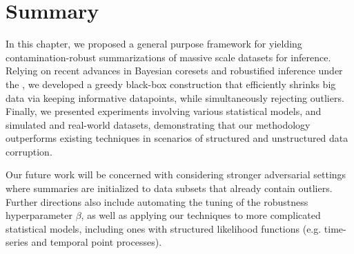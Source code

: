 \section{Summary}%
\label{sec:conclusion}
In this chapter, we proposed a general purpose framework for yielding  contamination-robust summarizations of massive scale datasets for inference. Relying on recent advances in Bayesian coresets and robustified inference under the \bdiv{}, we developed a greedy black-box construction that efficiently shrinks big data via keeping informative datapoints, while simultaneously rejecting outliers.
 Finally, we presented experiments involving various statistical models, and simulated and real-world datasets, demonstrating that our methodology outperforms existing techniques in scenarios of structured and unstructured data corruption. 

Our future work will be concerned with considering stronger adversarial settings where summaries are initialized to data subsets that already contain outliers. Further directions also include automating the tuning of the robustness hyperparameter $\beta$, as well as applying our techniques to more complicated statistical models, including ones with structured likelihood functions (e.g. time-series and temporal point processes).